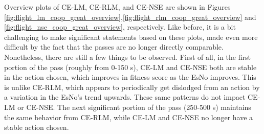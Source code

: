 \par Overview plots of CE-LM, CE-RLM, and CE-NSE are shown in Figures \ref{fig:flight_lm_coop_great_overview},\ref{fig:flight_rlm_coop_great_overview} and \ref{fig:flight_nse_coop_great_overview}, respectively. Like before, it is a bit challenging to make significant statements based on these plots, made even more difficult by the fact that the passes are no longer directly comparable. Nonetheless, there are still a few things to be observed. First of all, in the first portion of the pass (roughly from 0-150 s), CE-LM and CE-NSE both are stable in the action chosen, which improves in fitness score as the EsNo improves. This is unlike CE-RLM, which appears to periodically get dislodged from an action by a variation in the EsNo's trend upwards. These same patterns do not impact CE-LM or CE-NSE. The next significant portion of the pass (250-500 s) maintains the same behavior from CE-RLM, while CE-LM and CE-NSE no longer have a stable action chosen. 

